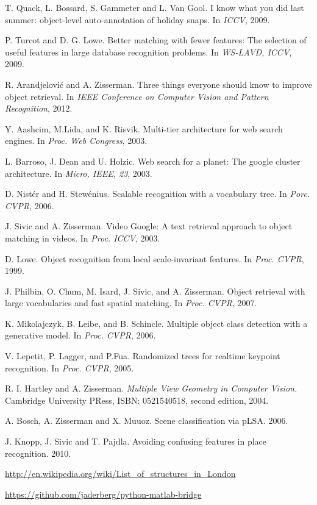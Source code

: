 \documentclass[11pt, onecolumn, a4paper, final]{report} %
\begin{document}
\begin{thebibliography}{99}

		T. Quack, L. Bossard, S. Gammeter and L. Van Gool.
		I know what you did last summer: object-level auto-annotation of holiday snaps.
		In \emph{ICCV}, 2009.

		P. Turcot and D. G. Lowe.
		Better matching with fewer features: The selection of useful features in large database recognition problems.
		In \emph{WS-LAVD, ICCV}, 2009.
		
		R. Arandjelovi\'{c} and A. Zisserman.
		Three things everyone should know to improve object retrieval.  
		In \emph{IEEE Conference on Computer Vision and Pattern Recognition}, 2012.
		
		Y. Aashcim, M.Lida, and K. Risvik.
		Multi-tier architecture for web search engines.
		In \emph{Proc. Web Congress}, 2003.
		
		L. Barroso, J. Dean and U. Holzic.
		Web search for a planet: The google cluster architecture.
		In \emph{Micro, IEEE, 23}, 2003.
		
		D. Nist\'{e}r and H. Stew\'{e}nius.
		Scalable recognition with a vocabulary tree.
		In \emph{Porc. CVPR}, 2006.
	
		J. Sivic and A. Zisserman.
		Video Google: A text retrieval approach to object matching in videos.
		In \emph{Proc. ICCV}, 2003.
		
		D. Lowe.
		Object recognition from local scale-invariant features. 
		In \emph{Proc. CVPR}, 1999.
	 
		J. Philbin, O. Chum, M. Isard, J. Sivic, and A. Zisserman. 
		Object
retrieval with large vocabularies and fast spatial matching. 
		In \emph{Proc. CVPR}, 2007.
		
		K. Mikolajczyk, B. Leibe, and B. Schincle.
		Multiple object class detection with a generative model.
		In \emph{Proc. CVPR}, 2006.
	  
		V. Lepetit, P. Lagger, and P.Fua.
		Randomized trees for realtime keypoint recognition.
		In \emph{Proc. CVPR}, 2005.
	 
	 	R. I. Hartley and A. Zisserman.
		\emph{Multiple View Geometry in Computer Vision.}
		Cambridge University PRess, ISBN: 0521540518, second edition, 2004.
		
		A. Bosch, A. Zisserman and X. Muuoz.
		Scene classification via pLSA.
		2006.
		
		J. Knopp, J. Sivic and T. Pajdla.
		Avoiding confusing features in place recognition.
		2010.
		
		\url{http://en.wikipedia.org/wiki/List_of_structures_in_London}
		
		\url{https://github.com/jaderberg/python-matlab-bridge}
	  
\end{thebibliography}
\end{document}
